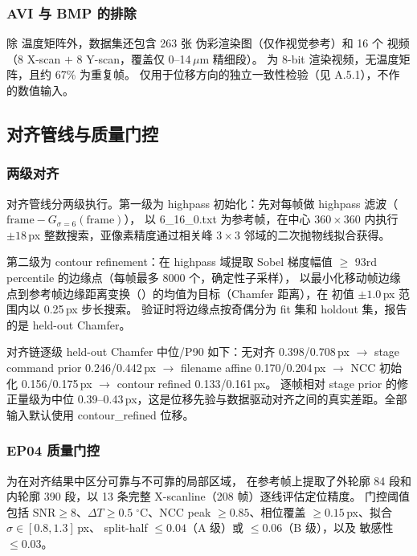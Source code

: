 \subsubsection{AVI 与 BMP 的排除}

除  温度矩阵外，数据集还包含 263 张  伪彩渲染图（仅作视觉参考）和 16 个  视频（8 X-scan \(+\) 8 Y-scan，覆盖仅 0--14\,\(\mu\)m 精细段）。
 为 8-bit 渲染视频，无温度矩阵，且约 67\% 为重复帧。 仅用于位移方向的独立一致性检验（见 A.5.1），不作  的数值输入。

\subsection{对齐管线与质量门控}

\subsubsection{两级对齐}

对齐管线分两级执行。第一级为 highpass  初始化：先对每帧做 highpass 滤波（\(\text{frame} - G_{\sigma=6}(\text{frame})\)），
以 6\_16\_0.txt 为参考帧，在中心 \(360 \times 360\)  内执行 \(\pm 18\)\,px 整数搜索，亚像素精度通过相关峰 \(3 \times 3\) 邻域的二次抛物线拟合获得。

第二级为 contour refinement：在 highpass 域提取 Sobel 梯度幅值 \(\ge\) 93rd percentile 的边缘点（每帧最多 8000 个，确定性子采样），
以最小化移动帧边缘点到参考帧边缘距离变换（）的均值为目标（Chamfer 距离），在  初值 \(\pm 1.0\)\,px 范围内以 0.25\,px 步长搜索。
验证时将边缘点按奇偶分为 fit 集和 holdout 集，报告的是 held-out Chamfer。

对齐链逐级 held-out Chamfer 中位/P90 如下：无对齐 0.398/0.708\,px \(\rightarrow\) stage command prior 0.246/0.442\,px \(\rightarrow\) filename affine 0.170/0.204\,px \(\rightarrow\) NCC 初始化 0.156/0.175\,px \(\rightarrow\) contour refined 0.133/0.161\,px。
逐帧相对 stage prior 的修正量级为中位 0.39--0.43\,px，这是位移先验与数据驱动对齐之间的真实差距。全部  输入默认使用 contour\_refined 位移。

\subsubsection{EP04 质量门控}

为在对齐结果中区分可靠与不可靠的局部区域， 在参考帧上提取了外轮廓 84 段和内轮廓 390 段，以 13 条完整 X-scanline（208 帧）逐线评估定位精度。
门控阈值包括 \(\mathrm{SNR} \ge 8\)、\(\Delta T \ge 0.5\;^\circ\mathrm{C}\)、NCC peak \(\ge 0.85\)、相位覆盖 \(\ge 0.15\)\,px、拟合 \(\sigma \in [0.8, 1.3]\)\,px、
split-half \(\le 0.04\)（A 级）或 \(\le 0.06\)（B 级），以及  敏感性 \(\le 0.03\)。


